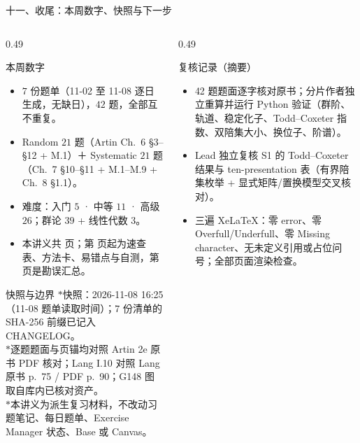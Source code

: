 \documentclass[aspectratio=169,10pt,fontset=none]{ctexbeamer}
\newcommand{\starpt}{\textcolor{accent}{\bfseries$\ast$}}
\begin{document}
\begin{frame}[t]{十一、收尾：本周数字、快照与下一步}
  \label{sec:wrap}
  \begin{columns}[T,onlytextwidth]
    \begin{column}{0.49\textwidth}
      \begin{block}{\footnotesize 本周数字}
        \scriptsize
        \begin{itemize}\setlength{\itemsep}{1pt}
          \item $7$ 份题单（11-02 至 11-08 逐日生成，无缺日），$42$ 题，全部互不重复。
          \item Random $21$ 题（Artin Ch.~6 \S3--\S12 + M.1）＋ Systematic $21$ 题（Ch.~7 \S10--\S11 + M.1--M.9 + Ch.~8 \S1.1）。
          \item 难度：入门 $5$ · 中等 $11$ · 高级 $26$；群论 $39$ + 线性代数 $3$。
          \item 本讲义共 \pageref{sec:wrap} 页；第 \pageref{sec:answers} 页起为速查表、方法卡、易错点与自测，第 \pageref{sec:errata} 页是勘误汇总。
        \end{itemize}
      \end{block}
      \begin{block}{\footnotesize 快照与边界}
        \scriptsize
        \starpt 快照：2026-11-08 16:25（11-08 题单读取时间）；7 份清单的 SHA-256 前缀已记入 CHANGELOG。\\
        \starpt 逐题题面与页锚均对照 Artin 2e 原书 PDF 核对；Lang I.10 对照 Lang 原书 p.~75 / PDF p.~90；G148 图取自库内已核对资产。\\
        \starpt 本讲义为派生复习材料，不改动习题笔记、每日题单、Exercise Manager 状态、Base 或 Canvas。
      \end{block}
    \end{column}
    \begin{column}{0.49\textwidth}
      \begin{block}{\footnotesize 复核记录（摘要）}
        \scriptsize
        \begin{itemize}\setlength{\itemsep}{1pt}
          \item 42 题题面逐字核对原书；分片作者独立重算并运行 Python 验证（群阶、轨道、稳定化子、Todd--Coxeter 指数、双陪集大小、换位子、阶谱）。
          \item Lead 独立复核 S1 的 Todd--Coxeter 结果与 ten-presentation 表（有界陪集枚举 + 显式矩阵/置换模型交叉核对）。
          \item 三遍 XeLaTeX：零 error、零 Overfull/Underfull、零 Missing character、无未定义引用或占位问号；全部页面渲染检查。

\end{itemize}
\end{block}
\end{column}
\end{columns}
\end{frame}
\end{document}
